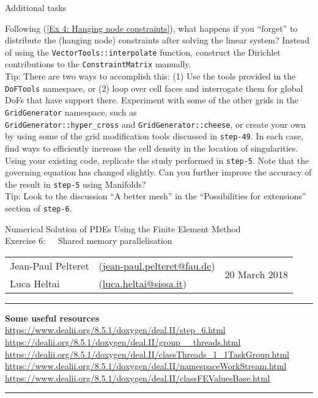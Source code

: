 \documentclass[11pt]{exam}
\makeatletter
\newcommand{\makeheader}[3]{%
\setcounter{question}{0}
\begin{center}
{\sc Numerical Solution of PDEs Using the Finite Element Method}\vspace{2ex}\\
{\sc Exercise #1:\ \ \ #2}\vspace{2ex}\\
\begin{tabular*}{\textwidth}{ll @{\extracolsep{\fill}}r}
Jean-Paul Pelteret & (\url{jean-paul.pelteret@fau.de}) & \multirow{2}{*}{#3} \\
Luca Heltai & (\url{luca.heltai@sissa.it}) & \\
\end{tabular*}
\end{center}
}
\newcommand{\makeresources}[1]{%
\rule{\textwidth}{0.6mm}
\textbf{Some useful resources}\\[1.5ex]
#1 \par
\rule{\textwidth}{0.6mm}
}
\makeatother
\begin{document}
\begin{questions}
\question Additional tasks
\begin{parts}
\bonuspart Following (\ref{Ex 4: Hanging node constraints}), what happens if you ``forget'' to distribute the (hanging node) constraints after solving the linear system?
\bonuspart Instead of using the \verb|VectorTools::interpolate| function, construct the Dirichlet contributions to the \verb|ConstraintMatrix| manually. \\
Tip: There are two ways to accomplish this: (1) Use the tools provided in the \verb|DoFTools| namespace, or (2) loop over cell faces and interrogate them for global DoFs that have support there.
\bonuspart Experiment with some of the other grids in the \verb|GridGenerator| namespace, such as \\\verb|GridGenerator::hyper_cross| and \verb|GridGenerator::cheese|, or create your own by using some of the grid modification tools discussed in \verb|step-49|.
In each case, find ways to efficiently increase the cell density in the location of singularities.
\bonuspart Using your existing code, replicate the study performed in \verb|step-5|. 
Note that the governing equation has changed slightly. 
Can you further improve the accuracy of the result in \verb|step-5| using Manifolds? \\
Tip: Look to the discussion ``A better mesh'' in the ``Possibilities for extensions'' section of \verb|step-6|.
\end{parts}

\end{questions}




\clearpage
\makeheader{6}{Shared memory parallelisation}{20 March 2018}
\makeresources{%
\url{https://www.dealii.org/8.5.1/doxygen/deal.II/step_6.html} \\
\url{https://dealii.org/8.5.1/doxygen/deal.II/group__threads.html} \\
\url{https://dealii.org/8.5.1/doxygen/deal.II/classThreads_1_1TaskGroup.html} \\
\url{https://www.dealii.org/8.5.1/doxygen/deal.II/namespaceWorkStream.html} \\
\url{https://www.dealii.org/8.5.1/doxygen/deal.II/classFEValuesBase.html}
}
\end{document}

